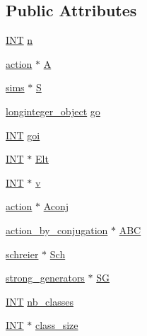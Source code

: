 \subsection*{Public Attributes}
\begin{DoxyCompactItemize}
\item 
\mbox{\hyperlink{galois_8h_a09fddde158a3a20bd2dcadb609de11dc}{I\+NT}} \mbox{\hyperlink{classyoung_a5a4ed3dd37f08aa25476be7f065966c4}{n}}
\item 
\mbox{\hyperlink{classaction}{action}} $\ast$ \mbox{\hyperlink{classyoung_a506057089ef566c932a1f9493d478a80}{A}}
\item 
\mbox{\hyperlink{classsims}{sims}} $\ast$ \mbox{\hyperlink{classyoung_a275b7085ff8ff4243091d5fdfcd24c27}{S}}
\item 
\mbox{\hyperlink{classlonginteger__object}{longinteger\+\_\+object}} \mbox{\hyperlink{classyoung_a61a29c4ab45286e92057f7f0a0f39c81}{go}}
\item 
\mbox{\hyperlink{galois_8h_a09fddde158a3a20bd2dcadb609de11dc}{I\+NT}} \mbox{\hyperlink{classyoung_aebe27c292c6fefad43887f5213d78633}{goi}}
\item 
\mbox{\hyperlink{galois_8h_a09fddde158a3a20bd2dcadb609de11dc}{I\+NT}} $\ast$ \mbox{\hyperlink{classyoung_a4119fa135642a56b1eb1dfa0b172c998}{Elt}}
\item 
\mbox{\hyperlink{galois_8h_a09fddde158a3a20bd2dcadb609de11dc}{I\+NT}} $\ast$ \mbox{\hyperlink{classyoung_a14a85fcb7a6636be06204ae5284ce248}{v}}
\item 
\mbox{\hyperlink{classaction}{action}} $\ast$ \mbox{\hyperlink{classyoung_a6dca538e379d56bfa2dea813ece17d19}{Aconj}}
\item 
\mbox{\hyperlink{classaction__by__conjugation}{action\+\_\+by\+\_\+conjugation}} $\ast$ \mbox{\hyperlink{classyoung_a3e19f5e6ae289d724b0dcd8feba88808}{A\+BC}}
\item 
\mbox{\hyperlink{classschreier}{schreier}} $\ast$ \mbox{\hyperlink{classyoung_a0988209861e75743fc08f9fa2e77a1d2}{Sch}}
\item 
\mbox{\hyperlink{classstrong__generators}{strong\+\_\+generators}} $\ast$ \mbox{\hyperlink{classyoung_a15ba6eae0083a330b458090189e879d0}{SG}}
\item 
\mbox{\hyperlink{galois_8h_a09fddde158a3a20bd2dcadb609de11dc}{I\+NT}} \mbox{\hyperlink{classyoung_a615eccb1f4aa61671948e8e82cdbb666}{nb\+\_\+classes}}
\item 
\mbox{\hyperlink{galois_8h_a09fddde158a3a20bd2dcadb609de11dc}{I\+NT}} $\ast$ \mbox{\hyperlink{classyoung_a1739642819920083f9078543187ffc97}{class\+\_\+size}}

\end{DoxyCompactItemize}
